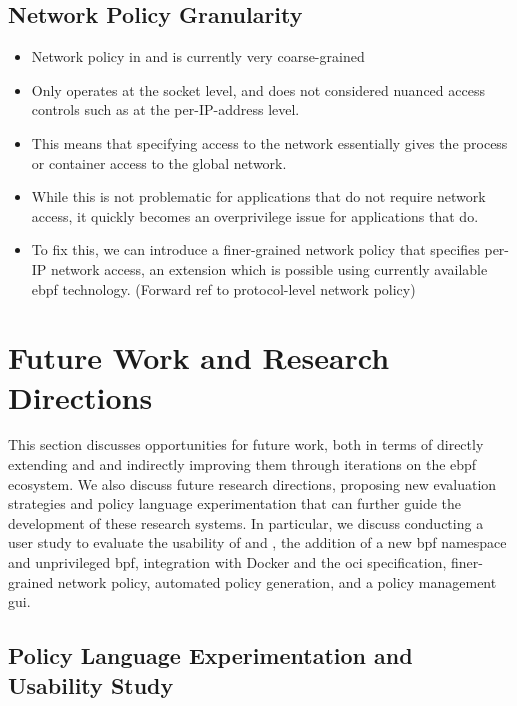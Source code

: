 \subsection{Network Policy Granularity}

\begin{inprogress}
  \begin{itemize}
    \item Network policy in \bpfbox{} and \bpfcontain{} is currently very coarse-grained
    \item Only operates at the socket level, and does not considered nuanced access
    controls such as at the per-IP-address level.
    \item This means that specifying access to the network essentially gives the process or container
    access to the global network.
    \item While this is not problematic for applications that do not require network access,
    it quickly becomes an overprivilege issue for applications that do.
    \item To fix this, we can introduce a finer-grained network policy that specifies per-IP network access, an extension which
    is possible using currently available \gls{ebpf} technology. (Forward ref to protocol-level network policy)
  \end{itemize}
\end{inprogress}


\section{Future Work and Research Directions}%
\label{s:disc-future-work}

This section discusses opportunities for future work, both in terms of directly extending
\bpfbox{} and \bpfcontain{} and indirectly improving them through iterations on the
\gls{ebpf} ecosystem. We also discuss future research directions, proposing new evaluation
strategies and policy language experimentation that can further guide the development of
these research systems. In particular, we discuss conducting a user study to evaluate the
usability of \bpfbox{} and \bpfcontain{}, the addition of a new \gls{bpf} namespace and
unprivileged \gls{bpf}, integration with Docker and the \gls{oci} specification,
finer-grained network policy, automated policy generation, and a policy management \gls{gui}.

\subsection{Policy Language Experimentation and Usability Study}

